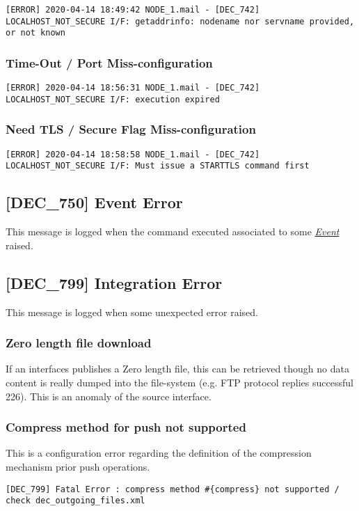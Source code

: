 \documentclass[dec_sum_main.tex]{subfiles}
\begin{document}
\begin{verbatim}
[ERROR] 2020-04-14 18:49:42 NODE_1.mail - [DEC_742] LOCALHOST_NOT_SECURE I/F: getaddrinfo: nodename nor servname provided, or not known
\end{verbatim}

\subsubsection{Time-Out / Port Miss-configuration}
\begin{verbatim}
[ERROR] 2020-04-14 18:56:31 NODE_1.mail - [DEC_742] LOCALHOST_NOT_SECURE I/F: execution expired
\end{verbatim}

\subsubsection{Need TLS / Secure Flag Miss-configuration}
\begin{verbatim}
[ERROR] 2020-04-14 18:58:58 NODE_1.mail - [DEC_742] LOCALHOST_NOT_SECURE I/F: Must issue a STARTTLS command first
\end{verbatim}

\label{DEC750}
\subsection{[DEC\_750] Event Error}
This message is logged when the command executed associated to some \hyperref[Events]{\textit{Event}} raised.

\label{DEC799}
\subsection{[DEC\_799] Integration Error}
This message is logged when some unexpected error raised.

\subsubsection{Zero length file download}
If an interfaces publishes a Zero length file, this can be retrieved though no data content is really dumped into the file-system (e.g. FTP protocol replies successful 226). This is an anomaly of the source interface.

\subsubsection{Compress method for push not supported}
This is a configuration error regarding the definition of the compression mechanism prior push operations.
\begin{verbatim}
[DEC_799] Fatal Error : compress method #{compress} not supported / check dec_outgoing_files.xml
\end{verbatim}
\end{document}
